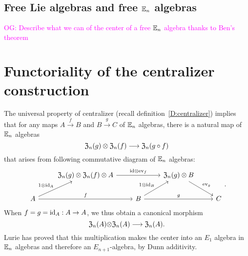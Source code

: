 \documentclass[11pt]{amsart}
\numberwithin{equation}{section}
\def\owen{\textcolor{magenta}{OG: }\textcolor{magenta}}
\begin{document}
\subsection{Free Lie algebras and free $\mathbb E_n$ algebras}

\owen{Describe what we can of the center of a free $\mathbb E_n$ algebra thanks to Ben's theorem}

\section{Functoriality of the centralizer construction}
\label{S:centerinFacAlg}

The universal property of centralizer (recall definition~\ref{D:centralizer}) implies that 
for any maps $A\stackrel{f}\to B$ and $B\stackrel{g}\to C$ of $\mathbb E_n$ algebras, 
there is a natural map of $\mathbb E_n$ algebras
\begin{equation}
\label{eqdef:canonicaltocentralizers} 
{\frak Z}_n(g) \otimes {\frak Z}_n(f) \longrightarrow {\frak Z}_n(g\circ f)
\end{equation}
that arises from following commutative diagram of $\mathbb E_n$ algebras:
\[
\begin{tikzcd}
&   {\frak Z}_n(g) \otimes  {\frak Z}_n(f) \otimes A \arrow[rr, "\id\otimes \ev_f"] &&  {\frak Z}_n(g) \otimes  B \arrow[dr, "\ev_g"]\\
A \arrow[ur, "1\otimes \id_A"] \arrow[rr, "f"] && B \arrow[rr, "g"] \arrow[ur, "1\otimes \id_B"] && C 
\end{tikzcd}.
\]
When $f=g={\rm id}_A:A\to A$, we thus obtain a canonical morphism 
\begin{equation} 
\label{eq:dgAssofcenter}
{\frak Z}_n(A){\otimes} {\frak Z}_n(A) \longrightarrow {\frak Z}_n(A).
\end{equation}
Lurie \cite{HA} has proved that this multiplication makes the center into an $E_1$ algebra in $\mathbb E_n$ algebras 
and therefore an $E_{n+1}$-algebra, by Dunn additivity. 
%
\end{document}
